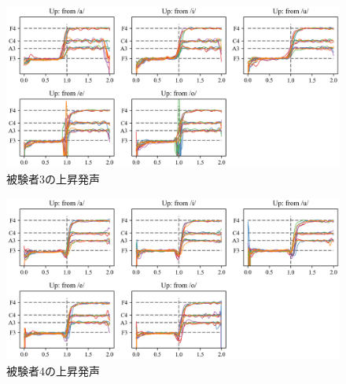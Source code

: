 \documentclass[10ptj,a4j,dvipdfmx,uplatex, oneside, openany]{jsbook}%
\begin{document}
\begin{figure}[htbp]
    \begin{center}
      \includegraphics[clip,width=16.0cm]{F0_up_3.png}
      \caption{被験者3の上昇発声}
      \label{fig:u3}
    \end{center}

\end{figure}\begin{figure}[htbp]
    \begin{center}
      \includegraphics[clip,width=16.0cm]{F0_up_4.png}
      \caption{被験者4の上昇発声}
      \label{fig:u4}
    \end{center}
\end{figure}
\end{document}
